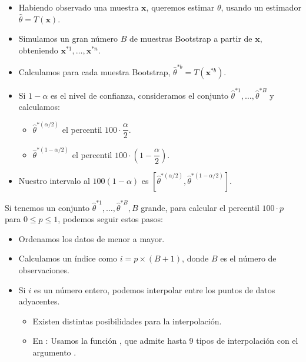 \begin{tcolorbox}[colback=blue!5!white, colframe=blue!75!black, title=\textbf{Procedimiento}]
\begin{itemize}[label=\textbullet]
    \item Habiendo observado una muestra $\mathbf{x}$, queremos estimar $\theta$, usando un estimador $\hat{\theta}=T(\mathbf{x})$.
    \item Simulamos un gran número $B$ de muestras Bootstrap a partir de $\mathbf{x}$, obteniendo $\mathbf{x}^{*1},\dots,\mathbf{x}^{*n}$.
    \item Calculamos para cada muestra Bootstrap, $\hat{\theta}^{*b}=T(\mathbf{x}^{*b})$.
    \item Si $1-\alpha$ es el nivel de confianza, consideramos el conjunto $\hat{\theta}^{*1},\dots,\hat{\theta}^{*B}$ y calculamos:
        \begin{itemize}[label=\textrightarrow]
            \item $\hat{\theta}^{*(\alpha /2)}$ el percentil $100\cdot \dfrac{\alpha}{2}$.
            \item $\hat{\theta}^{*(1-\alpha /2)}$ el percentil $100\cdot \left(1-\dfrac{\alpha}{2}\right)$.
        \end{itemize}
    \item Nuestro intervalo al $100(1-\alpha)$ es $[\hat{\theta}^{*(\alpha /2)},\hat{\theta}^{*(1-\alpha /2)}]$.
\end{itemize}
\end{tcolorbox}
\begin{tcolorbox}[colback=olive!5!white, colframe=olive!75!black, title=\textbf{¿Cómo se calcula el percentil $100\cdot p$?}]
    Si tenemos un conjunto $\hat{\theta}^{*1},\dots,\hat{\theta}^{*B}, B$ grande, para calcular el percentil $100\cdot p$ para $0\le p\le 1$, podemos seguir estos pasos:
    \begin{itemize}[label=\textbullet]
        \item Ordenamos los datos de menor a mayor.
        \item Calculamos un índice como $i=p\times (B+1)$, donde $B$ es el número de observaciones.
        \item Si  $i$ es un número entero, podemos interpolar entre los puntos de datos adyacentes.
            \begin{itemize}[label=\textbullet]
                \item Existen distintas posibilidades para la interpolación.
                \item En : Usamos la función , que admite hasta 9 tipos de interpolación con el argumento .
            \end{itemize}
    \end{itemize}
\end{tcolorbox}
